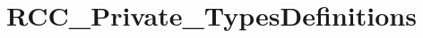 \hypertarget{group___r_c_c___private___types_definitions}{}\section{R\+C\+C\+\_\+\+Private\+\_\+\+Types\+Definitions}
\label{group___r_c_c___private___types_definitions}
